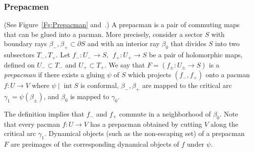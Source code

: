 \documentclass{amsart}
\renewcommand{\sp}{{\ \ }}
\newcommand{\1}{{\mathbb 1 }}
\newcommand\intr{\operatorname{int}}
\theoremstyle{remark}
\numberwithin{equation}{section}
\theoremstyle{definition}
\theoremstyle{nonumberbreak}
\begin{document}
\subsubsection{Prepacmen}\label{sss:prepacman} (See Figure~\ref{Fg:Prepacman} and~\cite[Definition 2.2]{DLS}.) A prepacman is a pair of commuting maps that can be glued into a pacman. More precisely, consider a sector $S$ with boundary rays
$\beta_-,\beta_+\subset \partial S$ and with an interior ray $\beta_0$ that divides $S$ into two subsectors $T_-,T_+$. Let $f_-\colon U_-\to S, \sp f_+\colon U_+\to S$ be a pair of holomorphic maps, defined on $U_-\subset T_-$ and $U_+\subset T_+$. We say that $F=(f_\pm \colon U_{\pm}\to S)$ is a \emph{prepacman} if there exists a
gluing $\psi$ of $S$ which projects $(f_-,f_+)$ onto a pacman $f\colon U\to V$ where $\psi\mid \intr S$ is conformal, $\beta_-, \beta_+$ are mapped to the critical arc $\gamma_1=\psi(\beta_\pm)$, and $\beta_0$ is mapped to $\gamma_0$.

The definition implies that $f_-$ and $f_+$ commute in a neighborhood of $\beta_0$. Note that every pacman $f\colon U\to V$ has a prepacman obtained by cutting $V$ along the critical arc $\gamma_1$. Dynamical objects (such as the non-escaping set) of a prepacman $F$ are preimages of the corresponding dynamical objects of $f$ under $\psi$. 
\end{document}

